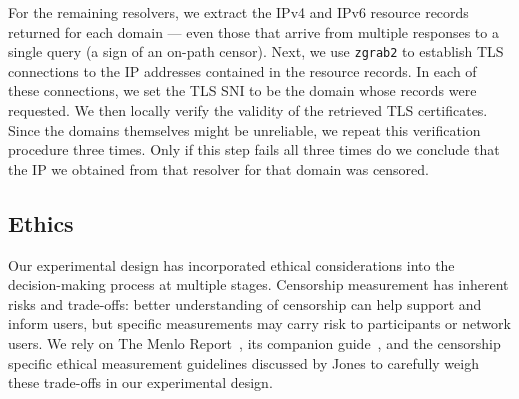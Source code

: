 For the remaining resolvers, we extract the IPv4 and IPv6 resource records
returned for each domain --- even those that arrive from multiple responses to
a single query (a sign of an on-path censor). Next, we use \texttt{zgrab2} to
establish TLS connections to the IP addresses contained in the resource
records. In each of these connections, we set the TLS SNI to be the domain
whose records were requested. We then locally verify the validity of the
retrieved TLS certificates.
%
Since the domains themselves might be unreliable, we repeat this verification
procedure three times. Only if this step fails all three times do we conclude
that the IP we obtained from that resolver for that domain was censored. 

\subsection{Ethics}\label{sec:v4vsv6-methodology:ethics}
Our experimental design has incorporated ethical considerations into the
decision-making process at multiple stages.
Censorship measurement has inherent risks and trade-offs: better understanding
of censorship can help support and inform users, but specific measurements may
carry risk to participants or network users.
We rely on The Menlo Report~\cite{menlo}, its companion
guide~\cite{menlo-companion}, and the censorship specific ethical measurement
guidelines discussed by Jones \etal \cite{jones2015ethical} to 
carefully weigh these trade-offs in our experimental design.


